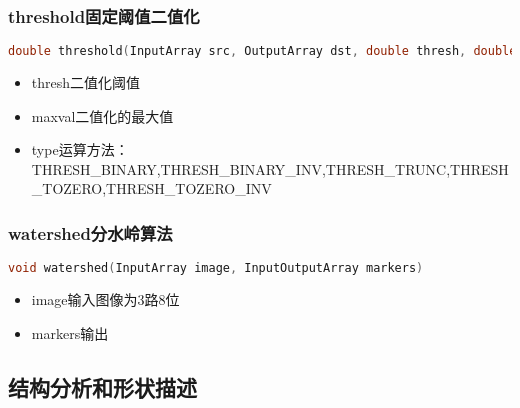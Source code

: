 \documentclass[12pt]{article}
\begin{document}
\subsubsection{threshold固定阈值二值化}
\begin{lstlisting}[language=c++]
double threshold(InputArray src, OutputArray dst, double thresh, double maxval, int type)
\end{lstlisting}
\begin{itemize}
\item thresh二值化阈值
\item maxval二值化的最大值
\item type运算方法：THRESH\_BINARY,THRESH\_BINARY\_INV,THRESH\_TRUNC,THRESH\_TOZERO,THRESH\_TOZERO\_INV
\end{itemize}

\subsubsection{watershed分水岭算法}
\begin{lstlisting}[language=c++]
void watershed(InputArray image, InputOutputArray markers)
\end{lstlisting}
\begin{itemize}
\item image输入图像为3路8位
\item markers输出
\end{itemize}


\subsection{结构分析和形状描述}
\end{document}
